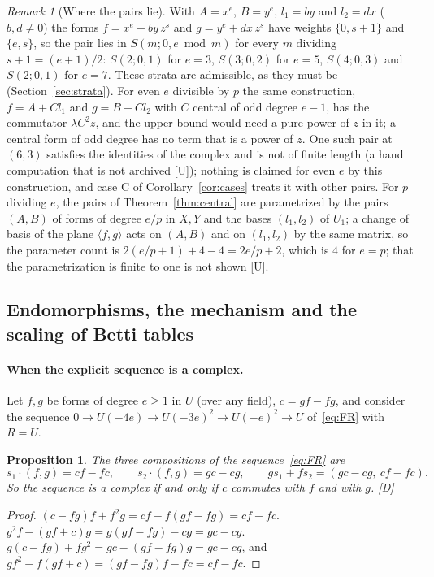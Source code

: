 \documentclass[11pt]{article}
\newtheorem{proposition}{Proposition}
\theoremstyle{definition}
\theoremstyle{remark}
\newtheorem{remark}{Remark}
\begin{document}
\begin{remark}[Where the pairs lie]\label{rem:central-strata}
With $A=x^e$, $B=y^e$, $l_1=by$ and $l_2=dx$ ($b,d\ne0$) the forms $f=x^e+by\,z^s$ and $g=y^e+dx\,z^s$ have weights $\{0,s+1\}$ and $\{e,s\}$, so the pair lies in $S(m;0,e\bmod m)$ for every $m$ dividing $s+1=(e+1)/2$: $S(2;0,1)$ for $e=3$, $S(3;0,2)$ for $e=5$, $S(4;0,3)$ and $S(2;0,1)$ for $e=7$. These strata are admissible, as they must be (Section~\ref{sec:strata}). For even $e$ divisible by $p$ the same construction, $f=A+Cl_1$ and $g=B+Cl_2$ with $C$ central of odd degree $e-1$, has the commutator $\lambda C^2z$, and the upper bound would need a pure power of $z$ in it; a central form of odd degree has no term that is a power of $z$. One such pair at $(6,3)$ satisfies the identities of the complex and is not of finite length (a hand computation that is not archived [U]); nothing is claimed for even $e$ by this construction, and case C of Corollary~\ref{cor:cases} treats it with other pairs. For $p$ dividing $e$, the pairs of Theorem~\ref{thm:central} are parametrized by the pairs $(A,B)$ of forms of degree $e/p$ in $X,Y$ and the bases $(l_1,l_2)$ of $U_1$; a change of basis of the plane $\langle f,g\rangle$ acts on $(A,B)$ and on $(l_1,l_2)$ by the same matrix, so the parameter count is $2(e/p+1)+4-4=2e/p+2$, which is $4$ for $e=p$; that the parametrization is finite to one is not shown [U].
\end{remark}

\subsection{Endomorphisms, the mechanism and the scaling of Betti tables}
\label{sec:scaling}

\paragraph{When the explicit sequence is a complex.} Let $f,g$ be forms of degree $e\ge1$ in $U$ (over any field), $c=gf-fg$, and consider the sequence $0\to U(-4e)\to U(-3e)^2\to U(-e)^2\to U$ of~\eqref{eq:FR} with $R=U$.

\begin{proposition}\label{prop:cx}
The three compositions of the sequence~\eqref{eq:FR} are
\[
s_1\cdot(f,g)=cf-fc,\qquad s_2\cdot(f,g)=gc-cg,\qquad gs_1+fs_2=(gc-cg,\ cf-fc).
\]
So the sequence is a complex if and only if $c$ commutes with $f$ and with $g$. [D]
\end{proposition}
\begin{proof}
$(c-fg)f+f^2g=cf-f(gf-fg)=cf-fc$. $g^2f-(gf+c)g=g(gf-fg)-cg=gc-cg$. $g(c-fg)+fg^2=gc-(gf-fg)g=gc-cg$, and $gf^2-f(gf+c)=(gf-fg)f-fc=cf-fc$.
\end{proof}
\end{document}
